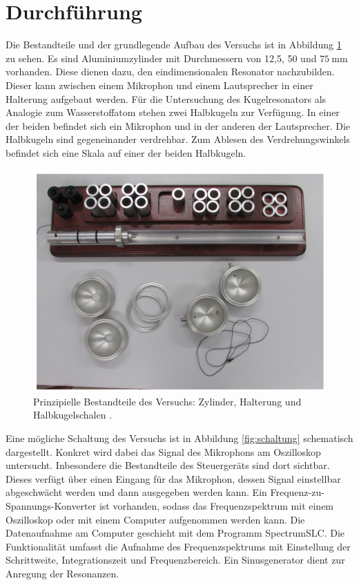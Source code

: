 \section{Durchführung}
\label{sec:Durchführung}
Die Bestandteile und der grundlegende Aufbau des Versuchs ist in Abbildung \ref{fig:grundlegenderAufbau} zu sehen. Es sind Aluminiumzylinder mit Durchmessern von 12,5, 50 und $\SI{75}{\milli\meter}$ vorhanden. Diese dienen dazu, den eindimensionalen Resonator nachzubilden. Dieser kann zwischen einem Mikrophon und einem Lautsprecher in einer Halterung aufgebaut werden. Für die Untersuchung des Kugelresonators als Analogie zum Wasserstoffatom stehen zwei Halbkugeln zur Verfügung. In einer der beiden befindet sich ein Mikrophon und in der anderen der Lautsprecher. Die Halbkugeln sind gegeneinander verdrehbar. Zum
Ablesen des Verdrehungswinkels befindet sich eine Skala auf einer der beiden Halbkugeln.\\

\begin{figure}
  \centering
  \includegraphics[width=\textwidth]{data/aufbau.png}
  \caption{Prinzipielle Bestandteile des Versuchs: Zylinder, Halterung und Halbkugelschalen \cite{Versuchsanleitung}.}
  \label{fig:grundlegenderAufbau}
\end{figure}
Eine mögliche Schaltung des Versuchs ist in Abbildung \ref{fig:schaltung} schematisch dargestellt. Konkret wird dabei das Signal des Mikrophons am Oszilloskop untersucht. Inbesondere die Bestandteile des Steuergeräts sind dort sichtbar.
Dieses verfügt über einen Eingang für das Mikrophon, dessen Signal einstellbar abgeschwächt werden und dann ausgegeben werden kann. Ein Frequenz-zu-Spannungs-Konverter ist vorhanden, sodass das Frequenzspektrum mit einem Oszilloskop oder mit einem Computer aufgenommen werden kann. Die Datenaufnahme am Computer geschieht mit dem Programm SpectrumSLC. Die Funktionalität umfasst die Aufnahme des Frequenzspektrums mit Einstellung der Schrittweite, Integrationszeit und Frequenzbereich. Ein Sinusgenerator dient zur Anregung der Resonanzen.\\

